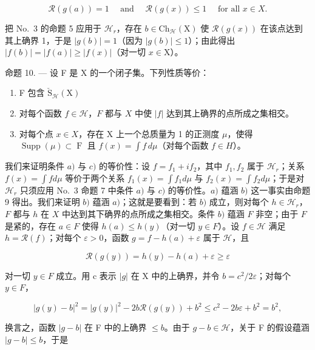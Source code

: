 \[
\mathscr {R} (g (a)) = 1 \quad \text { and } \quad \mathscr {R} (g (x)) \leqslant 1 \quad \text { for   all } x \in X.
\]

把 No.~3 的命题 5 应用于 \(\mathcal{H}_r\)，存在 \(b \in \mathrm{Ch}_{\mathcal{H}}(\mathrm{X})\) 使 \(\mathcal{R}(g(x))\) 在该点达到其上确界 1，于是 \(|g(b)| = 1\)（因为 \(|g(b)| \leqslant 1\)）；由此得出 \(|f(b)| = |f(a)| \geqslant |f(x)|\)（对一切 \(x \in \mathrm{X}\)）。

命题 10. --- 设 F 是 X 的一个闭子集。下列性质等价：

\begin{enumerate}
\def\labelenumi{\alph{enumi})}
\item
  F 包含 \(\check{\mathrm{S}}_{\mathcal{H}}(\mathrm{X})\)
\item
  对每个函数 \(f \in \mathcal{H}\)，\(F\) 都与 \(X\) 中使 \(|f|\) 达到其上确界的点所成之集相交。
\item
  对每个点 \(x \in X\)，存在 X 上一个总质量为 1 的正测度 \(\mu\)，使得 \(\operatorname{Supp}(\mu) \subset \operatorname{F}\) 且 \(f(x) = \int f \, d\mu\)（对每个函数 \(f \in H\)）。
\end{enumerate}

我们来证明条件 \(a)\) 与 \(c)\) 的等价性：设 \(f = f_{1} + if_{2}\)，其中 \(f_{1}, f_{2}\) 属于 \(\mathcal{H}_{r}\)；关系 \(f(x) = \int f d\mu\) 等价于两个关系 \(f_{1}(x) = \int f_{1} d\mu\) 与 \(f_{2}(x) = \int f_{2} d\mu\)；于是对 \(\mathcal{H}_{r}\) 只须应用 No.~3 命题 7 中条件 \(a)\) 与 \(c)\) 的等价性。\(a)\) 蕴涵 \(b)\) 这一事实由命题 9 得出。我们来证明 \(b)\) 蕴涵 \(a)\)；这就是要看到：若 \(b)\) 成立，则对每个 \(h \in \mathcal{H}_{r}\)，\(F\) 都与 \(h\) 在 \(X\) 中达到其下确界的点所成之集相交。条件 \(b)\) 蕴涵 \(F\) 非空；由于 \(F\) 是紧的，存在 \(a \in F\) 使得 \(h(a) \leqslant h(y)\)（对一切 \(y \in F\)）。设 \(f \in \mathcal{H}\) 满足 \(h = \mathcal{R}(f)\)；对每个 \(\varepsilon > 0\)，函数 \(g = f - h(a) + \varepsilon\) 属于 \(\mathcal{H}\)，且

\[
\mathcal {R} (g (y)) = h (y) - h (a) + \varepsilon \geqslant \varepsilon
\]

对一切 \(y \in F\) 成立。用 c 表示 \(|g|\) 在 X 中的上确界，并令 \(b = c^{2}/2\varepsilon\)；对每个 \(y \in F\)，

\[
\left| g (y) - b \right| ^ {2} = \left| g (y) \right| ^ {2} - 2 b \mathcal {R} (g (y)) + b ^ {2} \leqslant c ^ {2} - 2 b \varepsilon + b ^ {2} = b ^ {2},
\]

换言之，函数 \(|g - b|\) 在 F 中的上确界 \(\leqslant b\)。由于 \(g - b \in \mathcal{H}\)，关于 F 的假设蕴涵 \(|g - b| \leqslant b\)，于是

